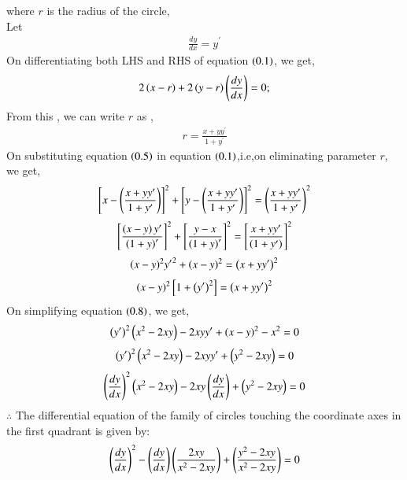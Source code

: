 \documentclass[journal]{IEEEtran}
\begin{document}
where $r$ is the radius of the circle,\\
Let 
\begin{align}
    \frac{dy}{dx} = y^\prime
\end{align}
On differentiating both LHS and RHS of equation $\left(0.1\right)$, we get,
\begin{align}
    2\left(x - r\right) + 2\left(y - r\right)\left(\frac{dy}{dx}\right) = 0;
\end{align}
From this , we can write $r$ as ,
\begin{align}
    r = \frac{x + yy^\prime}{1 + y^\prime}
\end{align}
On substituting equation $\left(0.5\right)$ in equation $\left(0.1\right)$,i.e,on eliminating parameter $r$, we get,
\begin{align}
    {\left[x - \ensuremath{\left(\frac{x + yy^\prime}{1 + y^\prime}\right)}\right]}^2 + {\left[y - \left(\frac{x + yy^\prime}{1 + y^\prime}\right)\right]}^2 ={\left(\frac{x + yy^\prime}{1 + y^\prime}\right)}^2 
    \end{align}
    \begin{align}
        {\left[\frac{\ensuremath{\left(x - y\right)}y^\prime}{\ensuremath{\left(1 + y\right)}^\prime}\right]}^2 + {\left[\frac{y - x}{\left(1 + y\right)^\prime}\right]}^2 = {\left[\frac{x + yy^\prime}{\left(1 + y^\prime\right)}\right]}^2
    \end{align}
    \begin{align}
         {\ensuremath{\left(x - y\right)}}^2{y^\prime}^2 + {\left(x - y\right)}^2 = {\left(x + yy^\prime\right)}^2
    \end{align}
   \begin{align}
    \left(x - y\right)^2\left[1 + \left(y^\prime\right)^2\right] = \left(x + yy^\prime\right)^2
\end{align}
On simplifying equation $\left(0.8\right)$, we get,
\begin{align}
    \left(y^\prime\right)^2\left(x^2 - 2xy\right) - 2xyy^\prime + \left(x - y\right)^2 - x^2 = 0
\end{align}
\begin{align}
    \left(y^\prime\right)^2\left(x^2 - 2xy\right) - 2xyy^\prime + \left(y^2 - 2xy\right) = 0 
\end{align}
\begin{align}
     \left(\frac{dy}{dx}\right)^2\left(x^2 - 2xy\right) - 2xy\left(\frac{dy}{dx}\right) + \left(y^2 - 2xy\right) = 0 
\end{align}
$\therefore$ The differential equation of the family of circles touching the coordinate axes in the first quadrant is given by:
\begin{align}
    \left(\frac{dy}{dx}\right)^2 - \left(\frac{dy}{dx}\right)\left(\frac{2xy}{x^2 - 2xy}\right) + \left(\frac{y^2 - 2xy}{x^2 - 2xy}\right) = 0
\end{align}
\end{document}

